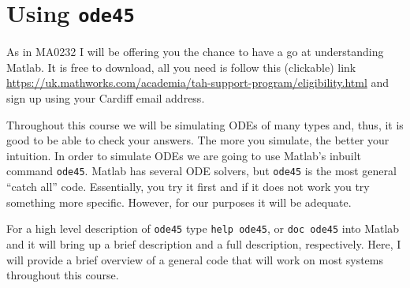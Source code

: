 \documentclass[10pt]{article}
\begin{document}
\section{Using \texttt{ode45}}
As in MA0232 I will be offering you the chance to have a go at understanding Matlab. It is free to download, all you need is follow this (clickable) link \url{https://uk.mathworks.com/academia/tah-support-program/eligibility.html} and sign up using your Cardiff email address.

Throughout this course we will be simulating ODEs of many types and, thus, it is good to be able to check your answers. The more you simulate, the better your intuition. In order to simulate ODEs we are going to use Matlab's inbuilt command \texttt{ode45}. Matlab has several ODE solvers, but  \texttt{ode45} is the most general ``catch all'' code. Essentially, you try it first and if it does not work you try something more specific. However, for our purposes it will be adequate. 

For a high level description of \texttt{ode45} type \texttt{help ode45}, or \texttt{doc ode45} into Matlab and it will bring up a brief description and a full description, respectively. Here, I will provide a brief overview of a general code that will work on most systems throughout this course.
\end{document}

